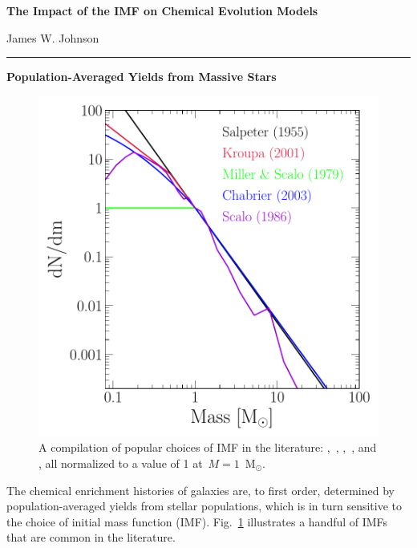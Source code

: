 \documentclass[12pt]{article}
\newcommand{\msun}{\ensuremath{\text{M}_\odot}}
\begin{document}
\begin{center}
\textbf{The Impact of the IMF on Chemical Evolution Models}
\par\null\par
James W. Johnson
\par\null\par
\rule[0.7\baselineskip]{0.5\textwidth}{0.4pt}
\end{center}

\par\noindent
\textbf{Population-Averaged Yields from Massive Stars}
\par\noindent
\begin{figure}
\centering
\includegraphics[scale = 0.5]{imfs.pdf}
\caption{
A compilation of popular choices of IMF in the literature:
\citet[][black]{Salpeter1955},~\citet[][red]{Kroupa2001},
\citet[][green]{Miller1979},~\citet[][blue]{Chabrier2003}, and
\citet[][purple]{Scalo1986}, all normalized to a value of 1 at~$M = 1$~\msun.
}
\label{fig:imfs}
\end{figure}
The chemical enrichment histories of galaxies are, to first order, determined
by population-averaged yields from stellar populations, which is in turn
sensitive to the choice of initial mass function (IMF).
Fig.~\ref{fig:imfs} illustrates a handful of IMFs that are common in the
literature.
\end{document}

